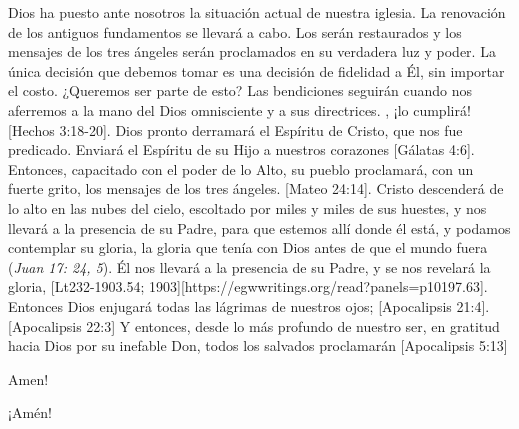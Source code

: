 Dios ha puesto ante nosotros la situación actual de nuestra iglesia. La renovación de los antiguos fundamentos se llevará a cabo. Los  serán restaurados y los mensajes de los tres ángeles serán proclamados en su verdadera luz y poder. La única decisión que debemos tomar es una decisión de fidelidad a Él, sin importar el costo. ¿Queremos ser parte de esto? Las bendiciones seguirán cuando nos aferremos a la mano del Dios omnisciente y a sus directrices. , ¡lo cumplirá! [Hechos 3:18-20]. Dios pronto derramará el Espíritu de Cristo, que nos fue predicado. Enviará el Espíritu de su Hijo a nuestros corazones [Gálatas 4:6].  Entonces, capacitado con el poder de lo Alto, su pueblo proclamará, con un fuerte grito, los mensajes de los tres ángeles. [Mateo 24:14]. Cristo descenderá de lo alto en las nubes del cielo, escoltado por miles y miles de sus huestes, y nos llevará a la presencia de su Padre, para que estemos allí donde él está, y podamos contemplar su gloria, la gloria que tenía con Dios antes de que el mundo fuera (\textit{Juan 17: 24, 5}). Él nos llevará a la presencia de su Padre, y se nos revelará la gloria, [Lt232-1903.54; 1903][https://egwwritings.org/read?panels=p10197.63]. Entonces Dios enjugará todas las lágrimas de nuestros ojos; [Apocalipsis 21:4]. [Apocalipsis 22:3] Y entonces, desde lo más profundo de nuestro ser, en gratitud hacia Dios por su inefable Don, todos los salvados  proclamarán [Apocalipsis 5:13]


Amen!


¡Amén!






